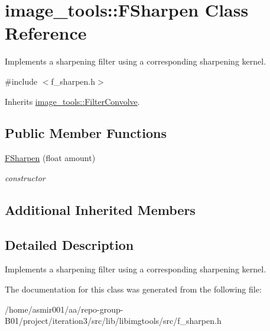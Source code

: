 \hypertarget{classimage__tools_1_1FSharpen}{}\section{image\+\_\+tools\+:\+:F\+Sharpen Class Reference}
\label{classimage__tools_1_1FSharpen}


Implements a sharpening filter using a corresponding sharpening kernel.  




{\ttfamily \#include $<$f\+\_\+sharpen.\+h$>$}



Inherits \hyperlink{classimage__tools_1_1FilterConvolve}{image\+\_\+tools\+::\+Filter\+Convolve}.

\subsection*{Public Member Functions}
\begin{DoxyCompactItemize}
\item 
\hyperlink{classimage__tools_1_1FSharpen_a0747ea46d9e9824241e4446d53a93299}{F\+Sharpen} (float amount)\hypertarget{classimage__tools_1_1FSharpen_a0747ea46d9e9824241e4446d53a93299}{}\label{classimage__tools_1_1FSharpen_a0747ea46d9e9824241e4446d53a93299}

\begin{DoxyCompactList}\small\item\em constructor \end{DoxyCompactList}\end{DoxyCompactItemize}
\subsection*{Additional Inherited Members}


\subsection{Detailed Description}
Implements a sharpening filter using a corresponding sharpening kernel. 

The documentation for this class was generated from the following file\+:\begin{DoxyCompactItemize}
\item 
/home/asmir001/aa/repo-\/group-\/\+B01/project/iteration3/src/lib/libimgtools/src/f\+\_\+sharpen.\+h\end{DoxyCompactItemize}
